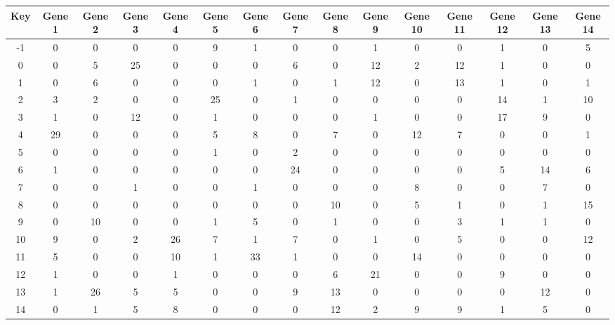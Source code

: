 \begin{tabular}{|c|c|c|c|c|c|c|c|c|c|c|c|c|c|c|}
\hline
Key & Gene 1 & Gene 2 & Gene 3 & Gene 4 & Gene 5 & Gene 6 & Gene 7 & Gene 8 & Gene 9 & Gene 10 & Gene 11 & Gene 12 & Gene 13 & Gene 14 \\
\hline
-1 & 0 & 0 & 0 & 0 & 9 & 1 & 0 & 0 & 1 & 0 & 0 & 1 & 0 & 5 \\
0 & 0 & 5 & 25 & 0 & 0 & 0 & 6 & 0 & 12 & 2 & 12 & 1 & 0 & 0 \\
1 & 0 & 6 & 0 & 0 & 0 & 1 & 0 & 1 & 12 & 0 & 13 & 1 & 0 & 1 \\
2 & 3 & 2 & 0 & 0 & 25 & 0 & 1 & 0 & 0 & 0 & 0 & 14 & 1 & 10 \\
3 & 1 & 0 & 12 & 0 & 1 & 0 & 0 & 0 & 1 & 0 & 0 & 17 & 9 & 0 \\
4 & 29 & 0 & 0 & 0 & 5 & 8 & 0 & 7 & 0 & 12 & 7 & 0 & 0 & 1 \\
5 & 0 & 0 & 0 & 0 & 1 & 0 & 2 & 0 & 0 & 0 & 0 & 0 & 0 & 0 \\
6 & 1 & 0 & 0 & 0 & 0 & 0 & 24 & 0 & 0 & 0 & 0 & 5 & 14 & 6 \\
7 & 0 & 0 & 1 & 0 & 0 & 1 & 0 & 0 & 0 & 8 & 0 & 0 & 7 & 0 \\
8 & 0 & 0 & 0 & 0 & 0 & 0 & 0 & 10 & 0 & 5 & 1 & 0 & 1 & 15 \\
9 & 0 & 10 & 0 & 0 & 1 & 5 & 0 & 1 & 0 & 0 & 3 & 1 & 1 & 0 \\
10 & 9 & 0 & 2 & 26 & 7 & 1 & 7 & 0 & 1 & 0 & 5 & 0 & 0 & 12 \\
11 & 5 & 0 & 0 & 10 & 1 & 33 & 1 & 0 & 0 & 14 & 0 & 0 & 0 & 0 \\
12 & 1 & 0 & 0 & 1 & 0 & 0 & 0 & 6 & 21 & 0 & 0 & 9 & 0 & 0 \\
13 & 1 & 26 & 5 & 5 & 0 & 0 & 9 & 13 & 0 & 0 & 0 & 0 & 12 & 0 \\
14 & 0 & 1 & 5 & 8 & 0 & 0 & 0 & 12 & 2 & 9 & 9 & 1 & 5 & 0 \\
\hline
\end{tabular}